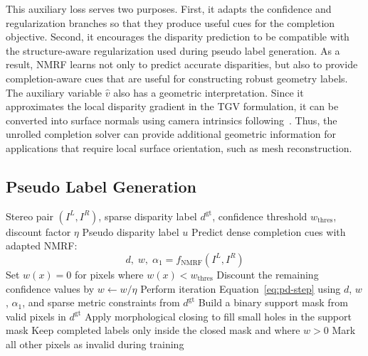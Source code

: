 This auxiliary loss serves two purposes.
First, it adapts the confidence and regularization branches so that they produce useful cues for the completion objective.
Second, it encourages the disparity prediction to be compatible with the structure-aware regularization used during pseudo label generation.
As a result, NMRF learns not only to predict accurate disparities, but also to provide completion-aware cues that are useful for constructing robust geometry labels.
The auxiliary variable $\hat{v}$ also has a geometric interpretation.
Since it approximates the local disparity gradient in the TGV formulation, it can be converted into surface normals using camera intrinsics following~\cite{rossi2020joint}.
Thus, the unrolled completion solver can provide additional geometric information for applications that require local surface orientation, such as mesh reconstruction.
\subsection{Pseudo Label Generation}

\begin{algorithm}[t]
	\caption{Structure-Aware Pseudo-Label Generation}
	\label{alg:sadc-pseudo-label}
	\begin{algorithmic}[1]
		\REQUIRE Stereo pair $(I^L,I^R)$, sparse disparity label $d^{\mathrm{gt}}$, confidence threshold $w_{\mathrm{thres}}$, discount factor $\eta$
		\ENSURE Pseudo disparity label $u$
		\STATE Predict dense completion cues with adapted NMRF:
		\[
		d,\; w,\; \alpha_1 = f_{\mathrm{NMRF}}(I^L,I^R)
		\]
		\STATE Set $w(x)=0$ for pixels where $w(x)<w_{\mathrm{thres}}$
		\STATE Discount the remaining confidence values by $w\leftarrow w/\eta$
		\STATE Perform iteration Equation~\ref{eq:pd-step} using $d$, $w$, $\alpha_1$, and sparse metric constraints from $d^{\mathrm{gt}}$
		\STATE Build a binary support mask from valid pixels in $d^{\mathrm{gt}}$
		\STATE Apply morphological closing to fill small holes in the support mask
		\STATE Keep completed labels only inside the closed mask and where $w>0$
		\STATE Mark all other pixels as invalid during training
	\end{algorithmic}
\end{algorithm}

